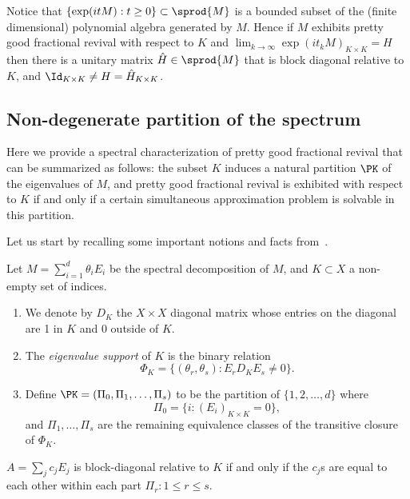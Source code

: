 Notice that $\{ \exp(i t M) : t \geq 0\}  \subset \sprod{M}$ is a bounded subset of the (finite dimensional) polynomial algebra generated by $M$. Hence if $M$ exhibits pretty good fractional revival with respect to $K$ and $\lim_{k \to \infty} \exp(i t_k M)_{K \times K} = H$ then there is a unitary matrix $\hat{H} \in \sprod{M}$ that is block diagonal relative to $K$, and $\Id_{K \times K} \neq H = \hat{H}_{K\times K}$. 

\subsection{Non-degenerate partition of the spectrum}

Here we provide a spectral characterization of pretty good fractional revival that can be summarized as follows: the subset $K$ induces a natural partition $\PK$ of the eigenvalues of $M$, and pretty good fractional revival is exhibited with respect to $K$ if and only if a certain simultaneous approximation problem is solvable in this partition. 

Let us start by recalling some important notions and facts from~\cite{chan2020fundamentals}.

\begin{defi}\label{def:partition}
Let $M = \sum_{i=1}^d \theta_i E_i$ be the spectral decomposition of $M$, and $K \subset X$ a non-empty set of indices.
\begin{enumerate}
\item We denote by $D_K$ the $X \times X$ diagonal matrix whose entries on the diagonal are 1 in $K$ and 0 outside of $K$. 
\item The \emph{eigenvalue support} of $K$ is the binary relation \[ \Phi_K = \{ (\theta_r, \theta_s) : E_r D_K E_s \neq 0 \}.\]
\item Define $\PK = (\Pi_0, \Pi_1,\dots, \Pi_s)$ to be the partition of $\{1,2,\dots, d\}$ where 
\[ \Pi_0 = \{ i: (E_i)_{K\times K} = 0 \},\] and $\Pi_1,\dots, \Pi_s$ are the remaining equivalence classes of the transitive closure of $\Phi_K$.
\end{enumerate}
\end{defi}

\begin{lemma}\label{lem:decomposable}
$A = \sum_j c_j E_j$ is block-diagonal relative to $K$ if and only if the $c_j$s are equal to each other within each part $\Pi_r : 1\leq r \leq s$.
\end{lemma}

